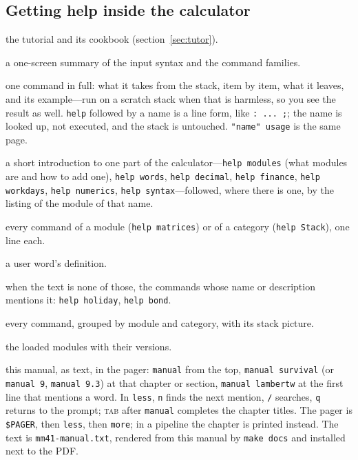 \documentclass[11pt,letterpaper]{article}
\newcommand{\code}[1]{\texttt{#1}}
\newcommand{\cmd}[1]{\texttt{\textbf{#1}}}
\begin{document}
\subsection{Getting help inside the calculator}
\label{sec:help}

\begin{description}[style=nextline,leftmargin=1.5em]
  \item[\cmd{tutor}, \cmd{examples}] the tutorial and its cookbook (section~\ref{sec:tutor}).
  \item[\cmd{help}] a one-screen summary of the input syntax and the command families.
  \item[\code{help \emph{name}}] one command in full: what it takes from the stack, item by item, what it leaves, and its example---run on a scratch stack when that is harmless, so you see the result as well. \code{help} followed by a name is a line form, like \code{: ... ;}; the name is looked up, not executed, and the stack is untouched. \code{"name" usage} is the same page.
  \item[\code{help \emph{topic}}] a short introduction to one part of the calculator---\code{help modules} (what modules are and how to add one), \code{help words}, \code{help decimal}, \code{help finance}, \code{help workdays}, \code{help numerics}, \code{help syntax}---followed, where there is one, by the listing of the module of that name.
  \item[\code{help \emph{module}}, \code{help \emph{category}}] every command of a module (\code{help matrices}) or of a category (\code{help Stack}), one line each.
  \item[\code{help \emph{word}}] a user word's definition.
  \item[\code{help \emph{text}}] when the text is none of those, the commands whose name or description mentions it: \code{help holiday}, \code{help bond}.
  \item[\cmd{listfcns}] every command, grouped by module and category, with its stack picture.
  \item[\cmd{modules}] the loaded modules with their versions.
  \item[\cmd{manual}] this manual, as text, in the pager: \code{manual} from the top, \code{manual survival} (or \code{manual 9}, \code{manual 9.3}) at that chapter or section, \code{manual lambertw} at the first line that mentions a word. In \code{less}, \code{n} finds the next mention, \code{/} searches, \code{q} returns to the prompt; \textsc{tab} after \code{manual} completes the chapter titles. The pager is \code{\$PAGER}, then \code{less}, then \code{more}; in a pipeline the chapter is printed instead. The text is \code{mm41-manual.txt}, rendered from this manual by \code{make docs} and installed next to the PDF.
\end{description}
\end{document}

